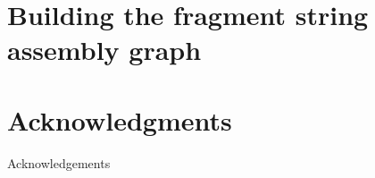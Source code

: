 \documentclass[10pt]{article}
\begin{document}
\begin{comment}
		\ENDFOR
	\ENDFOR
\end{algorithmic}
\end{algorithm}
\end{comment}


\section{Building the fragment string assembly graph}


\section*{Acknowledgments}

Acknowledgements



\end{document}
